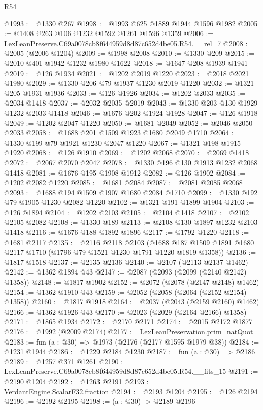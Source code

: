\begin{lexlean}{R54}
\begin{coremodule}
@1993 := @1330 @267
@1998 := @1993 @625 @1889 @1944 @1596 @1982
@2005 := @1408 @263 @106 @1232 @1592 @1261 @1596 @1359
@2006 := LexLeanPreserve.C69a0078cb8f644959d8d87c652d4be05.R54.__rel_7
@2008 := @2005 (@2006 @1204)
@2009 := @1998 @2008
@2010 := @1330 @209
@2015 := @2010 @401 @1942 @1232 @1980 @1622
@2018 := @1647 @208 @1939 @1941
@2019 := @126 @1934
@2021 := @1202 @2019 @1220
@2023 := @2018 @2021 @1980
@2029 := @1330 @206 @79 @1937 @1230 @2019 @1220
@2032 := @1321 @205 @1931 @1936
@2033 := @126 @1926
@2034 := @1202 @2033
@2035 := @2034 @1418
@2037 := @2032 @2035 @2019
@2043 := @1330 @203 @130 @1929 @1232 @2033 @1418
@2046 := @1676 @202 @1924 @1928
@2047 := @126 @1918
@2049 := @1202 @2047 @1220
@2050 := @1681 @2049
@2052 := @2046 @2050 @2033
@2058 := @1688 @201 @1509 @1923 @1680 @2049 @1710
@2064 := @1330 @199 @79 @1921 @1230 @2047 @1220
@2067 := @1321 @198 @1915 @1920
@2068 := @126 @1910
@2069 := @1202 @2068
@2070 := @2069 @1418
@2072 := @2067 @2070 @2047
@2078 := @1330 @196 @130 @1913 @1232 @2068 @1418
@2081 := @1676 @195 @1908 @1912
@2082 := @126 @1902
@2084 := @1202 @2082 @1220
@2085 := @1681 @2084
@2087 := @2081 @2085 @2068
@2093 := @1688 @194 @1509 @1907 @1680 @2084 @1710
@2099 := @1330 @192 @79 @1905 @1230 @2082 @1220
@2102 := @1321 @191 @1899 @1904
@2103 := @126 @1894
@2104 := @1202 @2103
@2105 := @2104 @1418
@2107 := @2102 @2105 @2082
@2108 := @1330 @189
@2113 := @2108 @130 @1897 @1232 @2103 @1418
@2116 := @1676 @188 @1892 @1896
@2117 := @1792 @1220
@2118 := @1681 @2117
@2135 := @2116
    @2118
    @2103
    (@1688 @187 @1509 @1891 @1680 @2117 @1710 (@1796 @79 @1521 @1230 @1791 @1220 @1819 @1358))
@2136 := @1817 @1518
@2137 := @2135 @2136
@2140 := @2107 (@2113 @2137 @1462)
@2142 := @1362 @1894 @43
@2147 := @2087 (@2093 (@2099 (@2140 @2142) @1358))
@2148 := @1817 @1902
@2152 := @2072 (@2078 (@2147 @2148) @1462)
@2154 := @1362 @1910 @43
@2159 := @2052 (@2058 (@2064 (@2152 @2154) @1358))
@2160 := @1817 @1918
@2164 := @2037 (@2043 (@2159 @2160) @1462)
@2166 := @1362 @1926 @43
@2170 := @2023 (@2029 (@2164 @2166) @1358)
@2171 := @1865 @1934
@2172 := @2170 @2171
@2174 := @2015 @2172 @1877
@2176 := @1992 (@2009 @2174)
@2177 := LexLeanPreservation.prim_natQuot
@2183 := fun (a : @30) => @1973 (@2176 (@2177 @1595 @1979 @38))
@2184 := @1231 @1944
@2186 := @1229 @2184 @1230
@2187 := fun (a : @30) => @2186
@2189 := @1257 @371 @1261
@2190 := LexLeanPreserve.C69a0078cb8f644959d8d87c652d4be05.R54.__fits_15
@2191 := @2190 @1204
@2192 := @1263 @2191
@2193 := VerdantEngine.ScalarF32.fraction
@2194 := @2193 @1204
@2195 := @126 @2194
@2196 := @2192 @2195
@2198 := (a : @30) -> @2189 @2196

\end{coremodule}
\end{lexlean}
